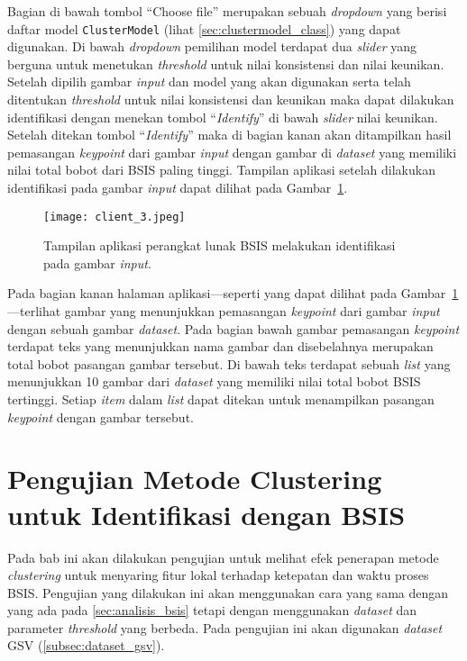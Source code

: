 Bagian di bawah tombol ``Choose file'' merupakan sebuah \textit{dropdown} yang berisi daftar model \texttt{ClusterModel} (lihat \ref{sec:clustermodel_class}) yang dapat digunakan. Di bawah \textit{dropdown} pemilihan model terdapat dua \textit{slider} yang berguna untuk menetukan \textit{threshold} untuk nilai konsistensi dan nilai keunikan. Setelah dipilih gambar \textit{input} dan model yang akan digunakan serta telah ditentukan \textit{threshold} untuk nilai konsistensi dan keunikan maka dapat dilakukan identifikasi dengan menekan tombol ``\textit{Identify}'' di bawah \textit{slider} nilai keunikan. Setelah ditekan tombol ``\textit{Identify}'' maka di bagian kanan akan ditampilkan hasil pemasangan \textit{keypoint} dari gambar \textit{input} dengan gambar di \textit{dataset} yang memiliki nilai total bobot dari BSIS paling tinggi. Tampilan aplikasi setelah dilakukan identifikasi pada gambar \textit{input} dapat dilihat pada Gambar~\ref{fig:client_3}.
\begin{figure}[H]
	\centering
	\texttt{[image: client\_3.jpeg]}
	\caption{Tampilan aplikasi perangkat lunak BSIS melakukan identifikasi pada gambar \textit{input}.}
	\label{fig:client_3}
\end{figure}
Pada bagian kanan halaman aplikasi---seperti yang dapat dilihat pada Gambar~\ref{fig:client_3}---terlihat gambar yang menunjukkan pemasangan \textit{keypoint} dari gambar \textit{input} dengan sebuah gambar \textit{dataset}. Pada bagian bawah gambar pemasangan \textit{keypoint} terdapat teks yang menunjukkan nama gambar dan disebelahnya merupakan total bobot pasangan gambar tersebut. Di bawah teks terdapat sebuah \textit{list} yang menunjukkan 10 gambar dari \textit{dataset} yang memiliki nilai total bobot BSIS tertinggi. Setiap \textit{item} dalam \textit{list} dapat ditekan untuk menampilkan pasangan \textit{keypoint} dengan gambar tersebut.

\section{Pengujian Metode Clustering untuk Identifikasi dengan BSIS}
Pada bab ini akan dilakukan pengujian untuk melihat efek penerapan metode \textit{clustering} untuk menyaring fitur lokal terhadap ketepatan dan waktu proses BSIS. Pengujian yang dilakukan ini akan menggunakan cara yang sama dengan yang ada pada \ref{sec:analisis_bsis} tetapi dengan menggunakan \textit{dataset} dan parameter \textit{threshold} yang berbeda. Pada pengujian ini akan digunakan \textit{dataset} GSV (\ref{subsec:dataset_gsv}).

